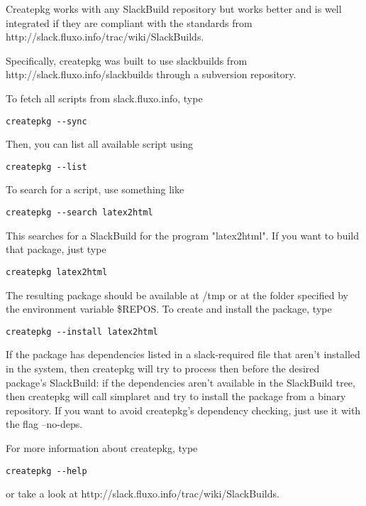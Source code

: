 \documentclass{article}
\begin{document}
Createpkg works with any SlackBuild repository but works better and is well integrated if they are compliant with the standards from http://slack.fluxo.info/trac/wiki/SlackBuilds.

Specifically, createpkg was built to use slackbuilds from http://slack.fluxo.info/slackbuilds through a subversion repository.

To fetch all scripts from slack.fluxo.info, type

\begin{verbatim}
createpkg --sync
\end{verbatim}

Then, you can list all available script using
  
\begin{verbatim}
createpkg --list
\end{verbatim}

To search for a script, use something like

\begin{verbatim}
createpkg --search latex2html
\end{verbatim}

This searches for a SlackBuild for the program "latex2html". If you want to build that package, just type

\begin{verbatim}
createpkg latex2html
\end{verbatim}

The resulting package should be available at /tmp or at the folder specified by the environment variable \$REPOS. To create and install the package, type

\begin{verbatim}
createpkg --install latex2html
\end{verbatim}

If the package has dependencies listed in a slack-required file that aren't installed in the system, then createpkg will try to process then before the desired package's SlackBuild: if the dependencies aren't available in the SlackBuild tree, then createpkg will call simplaret and try to install the package from a binary repository. If you want to avoid createpkg's dependency checking, just use it with the flag --no-deps.

For more information about createpkg, type

\begin{verbatim}
createpkg --help
\end{verbatim}

or take a look at http://slack.fluxo.info/trac/wiki/SlackBuilds.
\end{document}
